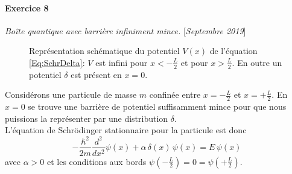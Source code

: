 \newpage

\paragraph{Exercice 8} \textit{Boîte quantique avec barrière infiniment mince.} \hfill [\textit{Septembre 2019}] \\

\begin{figure}[h!]
    \centering
    \caption{Représentation schématique du potentiel $V(x)$ de l'équation \eqref{Eq:SchrDelta}: $V$ est infini pour $x<-\frac{L}{2}$ et pour $x>\frac{L}{2}$. En outre un potentiel $\delta$ est présent en $x=0$.}
\end{figure}

Considérons une particule de masse $m$ confinée entre $x= -\frac{L}{2}$ et $x =+\frac{L}{2}$. En $x=0$ se trouve une barrière de potentiel suffisamment mince pour que nous puissions la représenter par une distribution $\delta$. \\

L'équation de Schrödinger stationnaire pour la particule est donc
\begin{equation}
-\frac{\hbar^2}{2m} \frac{d^2}{d x^2} \psi(x) + \alpha\, \delta(x)\, \psi(x)= E\, \psi(x)
\label{Eq:SchrDelta}
\end{equation}
avec $\alpha>0$ et les conditions aux bords $\psi(-\frac{L}{2})=0=\psi(+\frac{L}{2})$.

